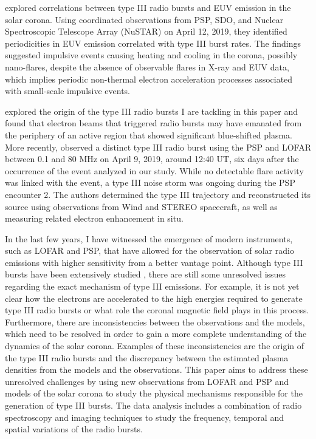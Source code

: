 \cite{cattell_2021} explored correlations between type III radio bursts and EUV emission in the solar corona. Using coordinated observations from PSP, SDO, and Nuclear Spectroscopic Telescope Array (NuSTAR) on April 12, 2019, they identified periodicities in EUV emission correlated with type III burst rates. The findings suggested impulsive events causing heating and cooling in the corona, possibly nano-flares, despite the absence of observable flares in X-ray and EUV data, which implies periodic non-thermal electron acceleration processes associated with small-scale impulsive events.

\cite{harra_2021} explored the origin of the type III radio bursts I are tackling in this paper and found that electron beams that triggered radio bursts may have emanated from the periphery of an active region that showed significant blue-shifted plasma.
More recently, \cite{badman_2022} observed a distinct type III radio burst using the PSP and LOFAR between 0.1 and 80 MHz on April 9, 2019, around 12:40 UT, six days after the occurrence of the event analyzed in our study. While no detectable flare activity was linked with the event, a type III noise storm was ongoing during the PSP encounter 2. The authors determined the type III trajectory and reconstructed its source using observations from Wind and STEREO spacecraft, as well as measuring related electron enhancement in situ.

In the last few years, I have witnessed the emergence of modern instruments, such as LOFAR and PSP, that have allowed for the observation of solar radio emissions with higher sensitivity from a better vantage point. Although type III bursts have been extensively studied \cite{dabrowski_2021}, there are still some unresolved issues regarding the exact mechanism of type III emissions.
For example, it is not yet clear how the electrons are accelerated to the high energies required to generate type III radio bursts or what role the coronal magnetic field plays in this process.
Furthermore, there are inconsistencies between the observations and the models, which need to be resolved in order to gain a more complete understanding of the dynamics of the solar corona. Examples of these inconsistencies are the origin of the type III radio bursts and the discrepancy between the estimated plasma densities from the models and the observations. This paper aims to address these unresolved challenges by using new observations from LOFAR and PSP and models of the solar corona to study the physical mechanisms responsible for the generation of type III bursts.
The data analysis includes a combination of radio spectroscopy and imaging techniques to study the frequency, temporal and spatial variations of the radio bursts. 

